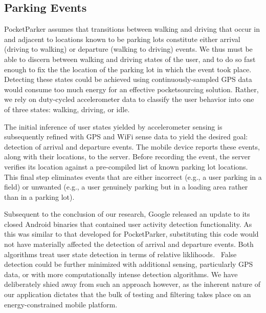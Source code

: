 \subsection{Parking Events}
\label{subsec-goals}

PocketParker assumes that transitions between walking and driving that occur
in and adjacent to locations known to be parking lots constitute either
arrival (driving to walking) or departure (walking to driving) events.  We thus
must be able to discern between walking and driving states of the user, and to 
do so fast enough to fix the the location of the parking lot in which the
event took place.  Detecting these states could be achieved using
continuously-sampled GPS data would consume too much energy for an effective
pocketsourcing solution.  Rather, we rely on duty-cycled accelerometer data to
classify the user behavior into one of three states: walking, driving, or idle.

The initial inference of user states yielded by accelerometer sensing is
subsequently refined with GPS and WiFi sense data to yield the desired goal:
detection of arrival and departure events.  The mobile device reports these
events, along with their locations, to the server.  Before recording the event,
the server verifies its location against a pre-compiled list of known parking
lot locations.  This final step eliminates events that are either
incorrect (e.g., a user parking in a field) or unwanted (e.g., a user genuinely
parking but in a loading area rather than in a parking lot).

Subsequent to the conclusion of our research, Google released an update to its
closed Android binaries that contained user activity detection functionality.
As this was similar to that developed for PocketParker, substituting this
code would not have materially affected the detection of arrival and departure 
events.  Both algorithms treat user state detection in terms of relative
liklihoods.~\cite{recognition-confidence}  False detection could be further 
minimized with additional sensing, particularly GPS data, or with more 
computationally intense detection algorithms.  We have deliberately shied away 
from such an approach however, as the inherent nature of our application 
dictates that the bulk of testing and filtering takes place on an 
energy-constrained mobile platform.
